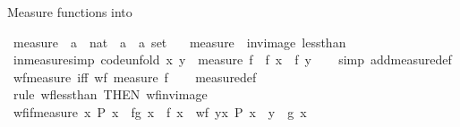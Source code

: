 \begin{isabellebody}
\begin{isamarkuptext}
Measure functions into %
\end{isamarkuptext}\isamarkuptrue%
\isamarkupfalse%
\ measure\ {\isacharcolon}{\kern0pt}{\isacharcolon}{\kern0pt}\ {\isachardoublequoteopen}{\isacharparenleft}{\kern0pt}{\isacharprime}{\kern0pt}a\ {\isasymRightarrow}\ nat{\isacharparenright}{\kern0pt}\ {\isasymRightarrow}\ {\isacharparenleft}{\kern0pt}{\isacharprime}{\kern0pt}a\ {\isasymtimes}\ {\isacharprime}{\kern0pt}a{\isacharparenright}{\kern0pt}\ set{\isachardoublequoteclose}\isanewline
\ \ \ {\isachardoublequoteopen}measure\ {\isacharequal}{\kern0pt}\ inv{\isacharunderscore}{\kern0pt}image\ less{\isacharunderscore}{\kern0pt}than{\isachardoublequoteclose}\isanewline
\isanewline
{}\isamarkupfalse%
\ in{\isacharunderscore}{\kern0pt}measure{\isacharbrackleft}{\kern0pt}simp{\isacharcomma}{\kern0pt}\ code{\isacharunderscore}{\kern0pt}unfold{\isacharbrackright}{\kern0pt}{\isacharcolon}{\kern0pt}\ {\isachardoublequoteopen}{\isacharparenleft}{\kern0pt}x{\isacharcomma}{\kern0pt}\ y{\isacharparenright}{\kern0pt}\ {\isasymin}\ measure\ f\ {\isasymlongleftrightarrow}\ f\ x\ {\isacharless}{\kern0pt}\ f\ y{\isachardoublequoteclose}\isanewline
%
\isadelimproof
\ \ %
\endisadelimproof
%
\isatagproof
{}\isamarkupfalse%
\ {\isacharparenleft}{\kern0pt}simp\ add{\isacharcolon}{\kern0pt}measure{\isacharunderscore}{\kern0pt}def{\isacharparenright}{\kern0pt}%
\endisatagproof
{\isafoldproof}%
%
\isadelimproof
\isanewline
%
\endisadelimproof
\isanewline
{}\isamarkupfalse%
\ wf{\isacharunderscore}{\kern0pt}measure\ {\isacharbrackleft}{\kern0pt}iff{\isacharbrackright}{\kern0pt}{\isacharcolon}{\kern0pt}\ {\isachardoublequoteopen}wf\ {\isacharparenleft}{\kern0pt}measure\ f{\isacharparenright}{\kern0pt}{\isachardoublequoteclose}\isanewline
%
\isadelimproof
\ \ %
\endisadelimproof
%
\isatagproof
{}\isamarkupfalse%
\ measure{\isacharunderscore}{\kern0pt}def\ \isamarkupfalse%
\ {\isacharparenleft}{\kern0pt}rule\ wf{\isacharunderscore}{\kern0pt}less{\isacharunderscore}{\kern0pt}than\ {\isacharbrackleft}{\kern0pt}THEN\ wf{\isacharunderscore}{\kern0pt}inv{\isacharunderscore}{\kern0pt}image{\isacharbrackright}{\kern0pt}{\isacharparenright}{\kern0pt}%
\endisatagproof
{\isafoldproof}%
%
\isadelimproof
\isanewline
%
\endisadelimproof
\isanewline
{}\isamarkupfalse%
\ wf{\isacharunderscore}{\kern0pt}if{\isacharunderscore}{\kern0pt}measure{\isacharcolon}{\kern0pt}\ {\isachardoublequoteopen}{\isacharparenleft}{\kern0pt}{\isasymAnd}x{\isachardot}{\kern0pt}\ P\ x\ {\isasymLongrightarrow}\ f{\isacharparenleft}{\kern0pt}g\ x{\isacharparenright}{\kern0pt}\ {\isacharless}{\kern0pt}\ f\ x{\isacharparenright}{\kern0pt}\ {\isasymLongrightarrow}\ wf\ {\isacharbraceleft}{\kern0pt}{\isacharparenleft}{\kern0pt}y{\isacharcomma}{\kern0pt}x{\isacharparenright}{\kern0pt}{\isachardot}{\kern0pt}\ P\ x\ {\isasymand}\ y\ {\isacharequal}{\kern0pt}\ g\ x{\isacharbraceright}{\kern0pt}{\isachardoublequoteclose}\isanewline

\end{isabellebody}
